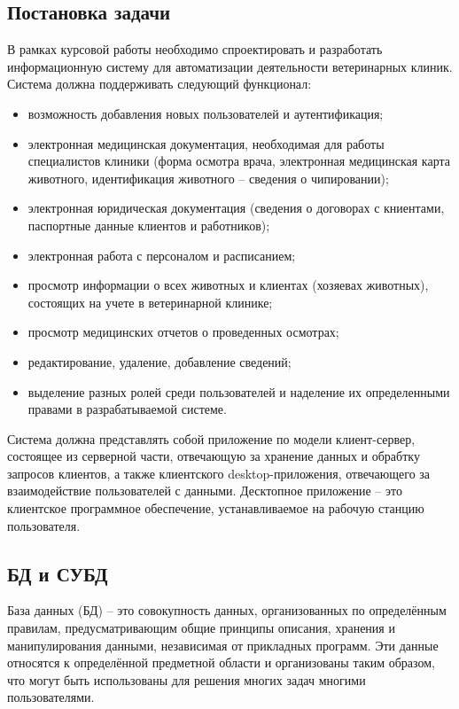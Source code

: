 \documentclass[a4paper,14pt]{article}
\begin{document}
\subsection{Постановка задачи}

В рамках курсовой работы необходимо спроектировать и разработать информационную систему для автоматизации деятельности ветеринарных клиник. Система должна поддерживать следующий функционал:

\begin{itemize}
	\item возможность добавления новых пользователей и аутентификация;
	\item электронная медицинская документация, необходимая для работы специалистов клиники (форма осмотра врача, электронная медицинская карта животного, идентификация животного -- сведения о чипировании);
	\item электронная юридическая документация (сведения о договорах с книентами, паспортные данные клиентов и работников);
	\item электронная работа с персоналом и расписанием;
	\item просмотр информации о всех животных и клиентах (хозяевах животных), состоящих на учете в ветеринарной клинике;
	\item просмотр медицинских отчетов о проведенных осмотрах;
	\item редактирование, удаление, добавление сведений;
	\item выделение разных ролей среди пользователей и наделение их определенными правами в разрабатываемой системе.
\end{itemize}

Система должна представлять собой приложение по модели клиент-сервер, состоящее из серверной части, отвечающую за хранение данных и обрабтку запросов клиентов, а также клиентского desktop-приложения, отвечающего за взаимодействие пользователей с данными. Десктопное приложение -- это клиентское программное обеспечение, устанавливаемое на рабочую станцию пользователя.

\subsection{БД и СУБД}

База данных (БД) -- это совокупность данных, организованных по определённым правилам, предусматривающим общие принципы описания, хранения и манипулирования данными, независимая от прикладных программ. Эти данные относятся к определённой предметной области и организованы таким образом, что могут быть использованы для решения многих задач многими пользователями.
\end{document}

